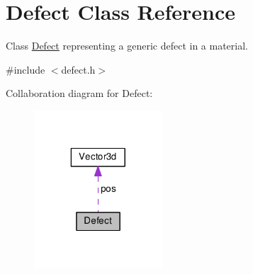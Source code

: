 \hypertarget{classDefect}{\section{Defect Class Reference}
\label{d5/d4f/classDefect}
}


Class \hyperlink{classDefect}{Defect} representing a generic defect in a material.  




{\ttfamily \#include $<$defect.\-h$>$}



Collaboration diagram for Defect\-:\nopagebreak
\begin{figure}[H]
\begin{center}
\leavevmode
\includegraphics[width=136pt]{d7/d09/classDefect__coll__graph}
\end{center}
\end{figure}

